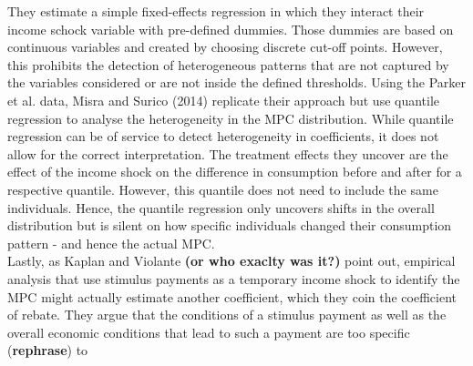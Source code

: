 They estimate a simple fixed-effects regression in which they interact their income schock variable with pre-defined dummies. Those dummies are based on continuous variables and created by choosing discrete cut-off points. However, this prohibits the detection of heterogeneous patterns that are not captured by the variables considered or are not inside the defined thresholds. Using the Parker et al. data, Misra and Surico (2014) replicate their approach but use quantile regression to analyse the heterogeneity in the MPC distribution. While quantile regression can be of service to detect heterogeneity in coefficients, it does not allow for the correct interpretation. The treatment effects they uncover are the effect of the income shock on the difference in consumption before and after for a respective quantile. However, this quantile does not need to include the same individuals. Hence, the quantile regression only uncovers shifts in the overall distribution but is silent on how specific individuals changed their consumption pattern - and hence the actual MPC. \\
Lastly, as Kaplan and Violante \textbf{(or who exaclty was it?)} point out, empirical analysis that use stimulus payments as a temporary income shock to identify the MPC might actually estimate another coefficient, which they coin the coefficient of rebate. They argue that the conditions of a stimulus payment as well as the overall economic conditions that lead to such a payment are too specific (\textbf{rephrase}) to 